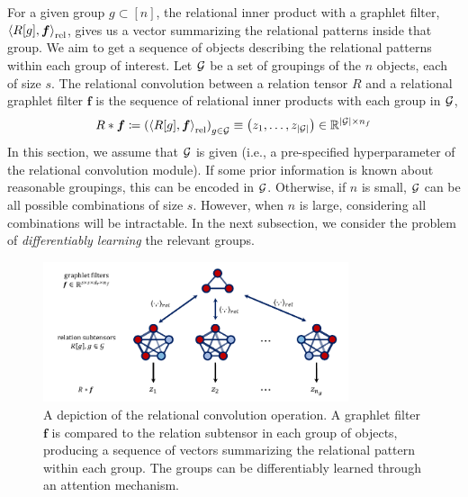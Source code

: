 For a given group $g \subset [n]$, the relational inner product with a graphlet filter, $\left \langle R[g], \bm{f} \right\rangle_\mathrm{rel}$, gives us a vector summarizing the relational patterns inside that group. We aim to get a sequence of objects describing the relational patterns within each group of interest. Let ${\mathcal{G}}$ be a set of groupings of the $n$ objects, each of size $s$. The relational convolution between a relation tensor $R$ and a relational graphlet filter $\bm{f}$ is the sequence of relational inner products with each group in ${\mathcal{G}}$,
\begin{equation}\label{eq:relational_convolution}
    R \ast \bm{f} \coloneq \left( \left\langle R[g], \boldsymbol{f} \right\rangle_\mathrm{rel} \right)_{g \in {\mathcal{G}}} \equiv \left(z_1, \ldots, z_{\left\lvert{\mathcal{G}}\right\rvert}\right) \in \mathbb{R}^{\left\lvert{\mathcal{G}}\right\rvert \times n_f}
\end{equation}
In this section, we assume that ${\mathcal{G}}$ is given (i.e., a pre-specified hyperparameter of the relational convolution module). If some prior information is known about reasonable groupings, this can be encoded in ${\mathcal{G}}$. Otherwise, if $n$ is small, ${\mathcal{G}}$ can be all possible combinations of size $s$. However, when $n$ is large, considering all combinations will be intractable. In the next subsection, we consider the problem of \textit{differentiably learning} the relevant groups.


\begin{figure}[t]
    \centering
    \includegraphics[width=0.8\textwidth]{figs/relconv_figs_updated.pdf}
    \vskip-12pt
    \caption{A depiction of the relational convolution operation. A graphlet filter $\bm{f}$ is compared to the relation subtensor in each group of objects, producing a sequence of vectors summarizing the relational pattern within each group. The groups can be differentiably learned through an attention mechanism.
    }\label{fig:relconvdiagram}
    \vskip-12pt
\end{figure}

